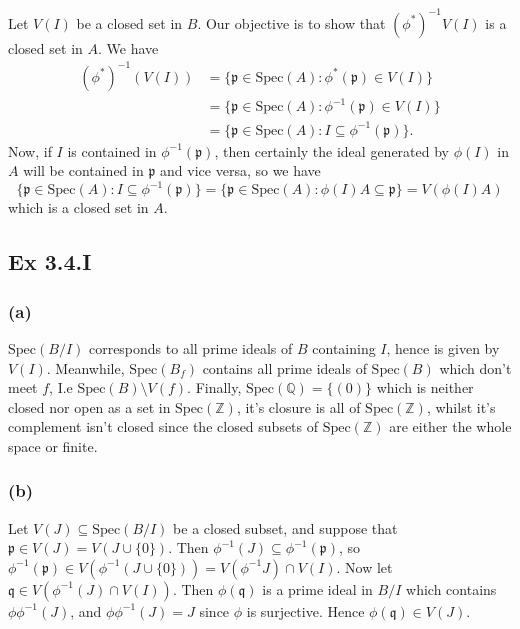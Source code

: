 \documentclass{article}
\theoremstyle{definition}
\newcommand{\Z}{\mathbb{Z}}
\newcommand{\Q}{\mathbb{Q}}
\newcommand{\Spec}{\text{Spec}}
\newcommand{\spec}{\Spec}
\begin{document}
Let $V(I)$ be a closed set in $B$. Our objective is to show that
$(\phi^*)^{-1}V(I)$ is a closed set in $A$. We have
\begin{align*}
	(\phi^*)^{-1}(V(I))
	 & =
	\{
	\mathfrak{p} \in \spec(A) : \phi^*(\mathfrak{p}) \in V(I)
	\}   \\
	 & =
	\{
	\mathfrak{p} \in \spec(A) : \phi^{-1}(\mathfrak{p}) \in V(I)
	\}   \\
	 & =
	\{
	\mathfrak{p} \in \spec(A) : I \subseteq \phi^{-1}(\mathfrak{p})
	\}.
\end{align*}
Now, if $I$ is contained in $\phi^{-1}(\mathfrak{p})$, then certainly the ideal
generated by $\phi(I)$ in $A$ will be contained in $\mathfrak{p}$ and vice versa,
so we have
\[
	\{
	\mathfrak{p} \in \spec(A) : I \subseteq \phi^{-1}(\mathfrak{p})
	\}
	=
	\{
	\mathfrak{p} \in \spec(A) : \phi(I)A \subseteq \mathfrak{p}
	\}
	=
	V(\phi(I)A)
\]
which is a closed set in $A$.

\subsection*{Ex 3.4.I}

\subsubsection*{(a)}

$\Spec(B/I)$ corresponds to all prime ideals of $B$ containing $I$, hence is
given by $V(I)$. Meanwhile, $\Spec(B_f)$ contains all prime ideals of
$\Spec(B)$ which don't meet $f$, I.e $\Spec(B) \setminus V(f)$. Finally,
$\Spec(\Q) = \{(0)\}$ which is neither closed nor open as a set in $\Spec(\Z)$,
it's closure is all of $\Spec(\Z)$, whilst it's complement isn't closed since
the closed subsets of $\Spec(\Z)$ are either the whole space or finite.

\subsubsection*{(b)}

Let $V(J) \subseteq \Spec(B/I)$ be a closed subset, and suppose that
$\mathfrak{p} \in V(J) = V(J \cup \{0\})$. Then $\phi^{-1}(J) \subseteq
	\phi^{-1}(\mathfrak{p})$, so $\phi^{-1}(\mathfrak{p}) \in V(\phi^{-1}(J \cup
	\{0\})) = V(\phi^{-1}J) \cap V(I)$. Now let $\mathfrak{q} \in V(\phi^{-1}(J)
	\cap V(I))$. Then $\phi(\mathfrak{q})$ is a prime ideal in $B/I$ which contains
$\phi\phi^{-1}(J)$, and $\phi\phi^{-1}(J) = J$ since $\phi$ is surjective. Hence
$\phi(\mathfrak{q}) \in V(J)$. \\
\end{document}
